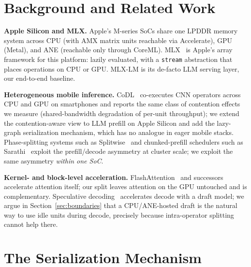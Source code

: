 \documentclass{article}
\begin{document}
\section{Background and Related Work}

\textbf{Apple Silicon and MLX.} Apple's M-series SoCs share one LPDDR memory
system across CPU (with AMX matrix units reachable via Accelerate), GPU
(Metal), and ANE (reachable only through CoreML). MLX~\cite{mlx2023} is
Apple's array framework for this platform: lazily evaluated, with a
\texttt{stream} abstraction that places operations on CPU or GPU. MLX-LM is
its de-facto LLM serving layer, our end-to-end baseline.

\textbf{Heterogeneous mobile inference.} CoDL~\cite{codl2022} co-executes CNN
operators across CPU and GPU on smartphones and reports the same class of
contention effects we measure (shared-bandwidth degradation of per-unit
throughput); we extend the contention-aware view to LLM prefill on Apple
Silicon and add the lazy-graph serialization mechanism, which has no analogue
in eager mobile stacks. Phase-splitting systems such as
Splitwise~\cite{splitwise2024} and chunked-prefill schedulers such as
Sarathi~\cite{sarathi2023} exploit the prefill/decode asymmetry at cluster
scale; we exploit the same asymmetry \emph{within one SoC}.

\textbf{Kernel- and block-level acceleration.} FlashAttention~\cite{dao2022}
and successors accelerate attention itself; our split leaves attention on the
GPU untouched and is complementary. Speculative
decoding~\cite{leviathan2023,chen2023} accelerates decode with a draft model;
we argue in Section~\ref{sec:boundaries} that a CPU/ANE-hosted draft is the
natural way to use idle units during decode, precisely because
intra-operator splitting cannot help there.

\section{The Serialization Mechanism}
\label{sec:mechanism}
\end{document}
